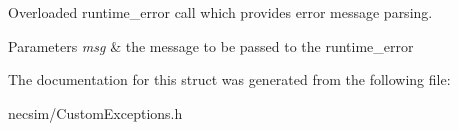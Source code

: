 Overloaded runtime\+\_\+error call which provides error message parsing. 


\begin{DoxyParams}{Parameters}
{\em msg} & the message to be passed to the runtime\+\_\+error \\
\hline
\end{DoxyParams}


The documentation for this struct was generated from the following file\+:\begin{DoxyCompactItemize}
\item 
necsim/Custom\+Exceptions.\+h\end{DoxyCompactItemize}
